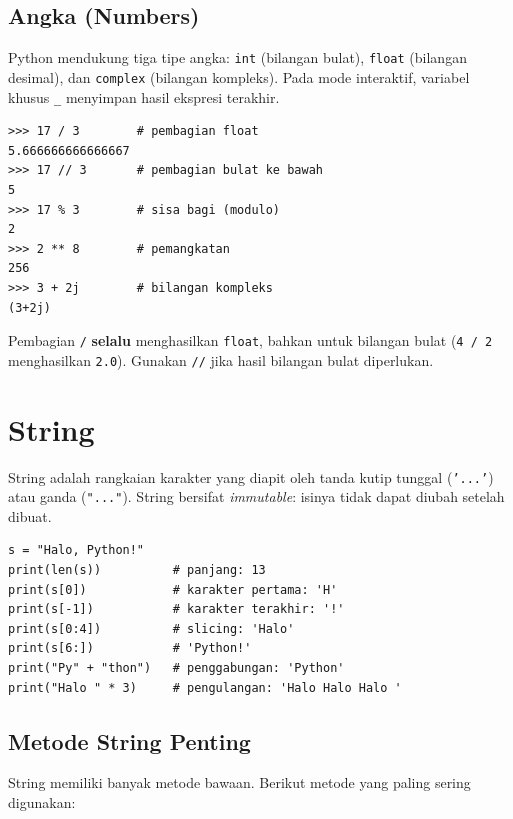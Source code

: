 \documentclass[../main.tex]{subfiles}
\begin{document}
\subsection{Angka (Numbers)}

Python mendukung tiga tipe angka: \texttt{int} (bilangan bulat), \texttt{float} (bilangan desimal), dan \texttt{complex} (bilangan kompleks). Pada mode interaktif, variabel khusus \texttt{\_} menyimpan hasil ekspresi terakhir.

\begin{lstlisting}[caption=Tipe angka dan operasi dasar (Tutorial Python ss3.1.1)]
>>> 17 / 3        # pembagian float
5.666666666666667
>>> 17 // 3       # pembagian bulat ke bawah
5
>>> 17 % 3        # sisa bagi (modulo)
2
>>> 2 ** 8        # pemangkatan
256
>>> 3 + 2j        # bilangan kompleks
(3+2j)
\end{lstlisting}

\begin{konsep}
Pembagian \texttt{/} \textbf{selalu} menghasilkan \texttt{float}, bahkan untuk bilangan bulat (\texttt{4 / 2} menghasilkan \texttt{2.0}). Gunakan \texttt{//} jika hasil bilangan bulat diperlukan.
\end{konsep}

\section{String}

String adalah rangkaian karakter yang diapit oleh tanda kutip tunggal (\texttt{'...'}) atau ganda (\texttt{"..."}). String bersifat \textit{immutable}: isinya tidak dapat diubah setelah dibuat.

\begin{lstlisting}[caption=Operasi dasar string (Tutorial Python ss3.1.2)]
s = "Halo, Python!"
print(len(s))          # panjang: 13
print(s[0])            # karakter pertama: 'H'
print(s[-1])           # karakter terakhir: '!'
print(s[0:4])          # slicing: 'Halo'
print(s[6:])           # 'Python!'
print("Py" + "thon")   # penggabungan: 'Python'
print("Halo " * 3)     # pengulangan: 'Halo Halo Halo '
\end{lstlisting}

\subsection{Metode String Penting}

String memiliki banyak metode bawaan. Berikut metode yang paling sering digunakan:
\end{document}
